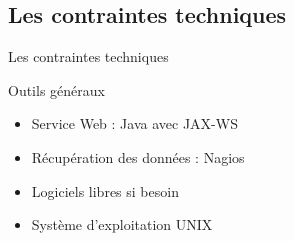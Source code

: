
\subsection{Les contraintes techniques}

\begin{frame}{Les contraintes techniques}
	\begin{block}{Outils g\'en\'eraux}
		\begin{itemize}
			\item Service Web : Java avec JAX-WS
			\item R\'ecup\'eration des donn\'ees : Nagios
			\item Logiciels libres si besoin
			\item Syst\`eme d'exploitation UNIX
			
		\end{itemize}
		
	\end{block}
	
\end{frame}
